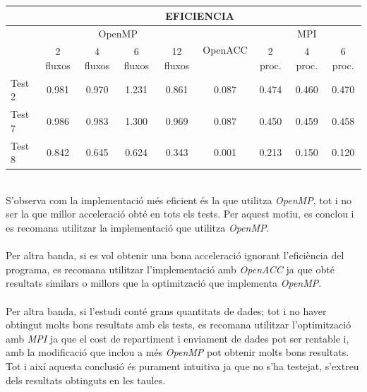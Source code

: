 \documentclass[a4paper, 11pt]{article}
\begin{document}
\begin{table}[h]
  \centering
  \begin{tabular}{l||c|c|c|c|c|c|c|c}
        \cellcolor{black}{} & \multicolumn{8}{c}{EFICIENCIA} \\\hline
        \cellcolor{black}{} & \multicolumn{4}{c|}{OpenMP} & \multirow{2}{*}{OpenACC} & \multicolumn{3}{c}{MPI}\\
        \cellcolor{black}{} & 2 fluxos & 4 fluxos & 6 fluxos & 12 fluxos &  & 2 proc. & 4 proc. & 6 proc. \\\hline\hline
        Test 2 & 0.981 & 0.970 & 1.231 & 0.861 & 0.087 & 0.474 & 0.460 & 0.470 \\\hline
        Test 7 & 0.986 & 0.983 & 1.300 & 0.969 & 0.087 & 0.450 & 0.459 & 0.458 \\\hline
        Test 8 & 0.842 & 0.645 & 0.624 & 0.343 & 0.001 & 0.213 & 0.150 & 0.120 \\
    \end{tabular}
\end{table}\\
S'observa com la implementació més eficient és la que utilitza \textit{OpenMP}, tot i no ser la que millor acceleració obté en tots els tests. Per aquest motiu, es conclou i es recomana utilitzar la implementació que utilitza \textit{OpenMP}.\\\\
Per altra banda, si es vol obtenir una bona acceleració ignorant l'eficiència del programa, es recomana utilitzar l'implementació amb \textit{OpenACC} ja que obté resultats similars o millors que la optimització que implementa \textit{OpenMP}.\\\\
Per altra banda, si l'estudi conté grans quantitats de dades; tot i no haver obtingut molts bons resultats amb els tests, es recomana utilitzar l'optimització amb \textit{MPI} ja que el cost de repartiment i  enviament de dades pot ser rentable i, amb la modificació que inclou a més \textit{OpenMP} pot obtenir molts bons resultats. Tot i així aquesta conclusió és purament intuitiva ja que no s'ha testejat, s'extreu dels resultats obtinguts en les taules.
\newpage
\end{document}
